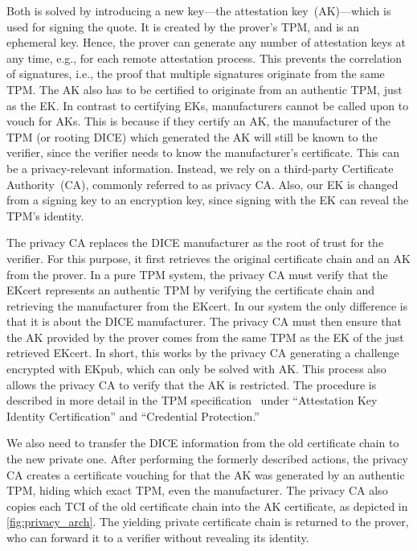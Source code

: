 Both is solved by introducing a new key---the attestation key~(AK)---which is used for signing the quote.
It is created by the prover's TPM, and is an ephemeral key.
Hence, the prover can generate any number of attestation keys at any time, e.g., for each remote attestation process.
This prevents the correlation of signatures, i.e., the proof that multiple signatures originate from the same TPM\@.
The AK also has to be certified to originate from an authentic TPM, just as the EK\@.
In contrast to certifying EKs, manufacturers cannot be called upon to vouch for AKs.
This is because if they certify an AK, the manufacturer of the TPM (or rooting DICE) which generated the AK will still be known to the verifier, since the verifier needs to know the manufacturer's certificate.
This can be a privacy-relevant information.
Instead, we rely on a third-party Certificate Authority~(CA), commonly referred to as privacy CA\@.
Also, our EK is changed from a signing key to an encryption key, since signing with the EK can reveal the TPM's identity.

The privacy CA replaces the DICE manufacturer as the root of trust for the verifier.
For this purpose, it first retrieves the original certificate chain and an AK from the prover.
In a pure TPM system, the privacy CA must verify that the EKcert represents an authentic TPM by verifying the certificate chain and retrieving the manufacturer from the EKcert.
In our system the only difference is that it is about the DICE manufacturer.
The privacy CA must then ensure that the AK provided by the prover comes from the same TPM as the EK of the just retrieved EKcert.
In short, this works by the privacy CA generating a challenge encrypted with EKpub, which can only be solved with AK\@.
This process also allows the privacy CA to verify that the AK is restricted.
The procedure is described in more detail in the TPM specification~\cite{tpm} under ``Attestation Key Identity Certification'' and ``Credential Protection.''



We also need to transfer the DICE information from the old certificate chain to the new private one.
After performing the formerly described actions, the privacy CA creates a certificate vouching for that the AK was generated by an authentic TPM, hiding which exact TPM, even the manufacturer.
The privacy CA also copies each TCI of the old certificate chain into the AK certificate, as depicted in \autoref{fig:privacy_arch}.
The yielding private certificate chain is returned to the prover, who can forward it to a verifier without revealing its identity.

